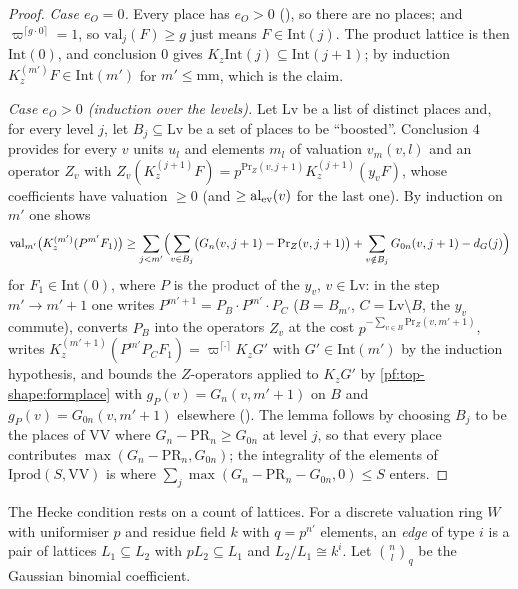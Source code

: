 \begin{proof}
\emph{Case $e_O=0$.} Every place has $e_O>0$ (), so
there are no places; and $\varpi^{\lceil g\cdot0\rceil}=1$, so $\mathrm{val}_j(F)\ge g$ just means $F\in\mathrm{Int}(j)$. The product
lattice is then $\mathrm{Int}(0)$, and conclusion $0$ gives $K_z\mathrm{Int}(j)\subseteq\mathrm{Int}(j+1)$; by induction
$K_z^{(m')}F\in\mathrm{Int}(m')$ for $m'\le\mathrm{mm}$, which is the claim.

\emph{Case $e_O>0$ (induction over the levels).} Let $\mathrm{Lv}$ be a list of distinct places and, for every level $j$, let
$B_j\subseteq\mathrm{Lv}$ be a set of places to be ``boosted''. Conclusion $4$ provides for every $v$ units $u_l$ and elements
$m_l$ of valuation $v_m(v,l)$ and an operator $Z_v$ with $Z_v(K_z^{(j+1)}F)=p^{\mathrm{Pr}_Z(v,j+1)}K_z^{(j+1)}(y_vF)$, whose
coefficients have valuation $\ge0$ (and $\ge\mathrm{al}_{\rm ev}(v)$ for the last one). By induction on $m'$ one shows
\[
\mathrm{val}_{m'}\bigl(K_z^{(m')}(P^{m'}F_1)\bigr)\ge\sum_{j<m'}\Bigl(\sum_{v\in B_j}\bigl(G_n(v,j+1)-\mathrm{Pr}_Z(v,j+1)\bigr)
+\sum_{v\notin B_j}G_{0n}(v,j+1)-d_G(j)\Bigr)
\]
for $F_1\in\mathrm{Int}(0)$, where $P$ is the product of the $y_v$, $v\in\mathrm{Lv}$: in the step $m'\to m'+1$ one writes
$P^{m'+1}=P_{B}\cdot P^{m'}\cdot P_{C}$ ($B=B_{m'}$, $C=\mathrm{Lv}\setminus B$, the $y_v$ commute), converts $P_B$ into the operators
$Z_v$ at the cost $p^{-\sum_{v\in B}\mathrm{Pr}_Z(v,m'+1)}$, writes $K_z^{(m'+1)}(P^{m'}P_CF_1)=\varpi^{\lceil\cdot\rceil}K_zG'$ with $G'\in\mathrm{Int}(m')$ by
the induction hypothesis, and bounds the $Z$-operators applied to $K_zG'$ by \cref{pf:top-shape:formplace} with
$g_P(v)=G_n(v,m'+1)$ on $B$ and $g_P(v)=G_{0n}(v,m'+1)$ elsewhere
(). The lemma follows by choosing $B_j$ to be the places of
$\mathrm{VV}$ where $G_n-\mathrm{PR}_n\ge G_{0n}$ at level $j$, so that every place contributes $\max(G_n-\mathrm{PR}_n,G_{0n})$;
the integrality of the elements of $\mathrm{Iprod}(S,\mathrm{VV})$ is where $\sum_j\max(G_n-\mathrm{PR}_n-G_{0n},0)\le S$ enters.
\end{proof}

The Hecke condition rests on a count of lattices. For a discrete valuation ring $W$ with uniformiser $p$ and residue field
$k$ with $q=p^{n'}$ elements, an \emph{edge} of type $i$ is a pair of lattices $L_1\subseteq L_2$ with $pL_2\subseteq L_1$ and
$L_2/L_1\cong k^i$. Let $\binom{n}{l}_q$ be the Gaussian binomial coefficient.

